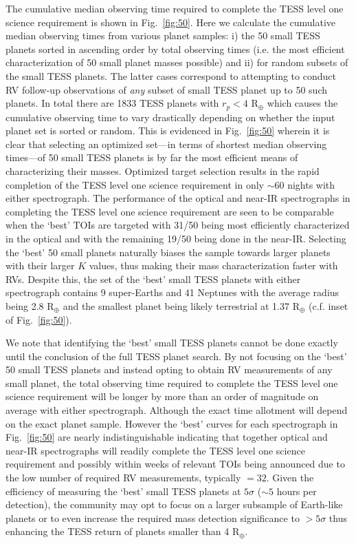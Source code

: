 The cumulative median observing time required to complete the TESS level one science requirement is shown
in Fig.~\ref{fig:50}. Here we calculate the cumulative median observing times from various planet samples:
i) the 50 small TESS planets sorted in ascending order by total observing times
(i.e. the most efficient characterization of 50 small planet masses possible) and ii)
for random subsets of the small TESS planets.
The latter cases correspond to attempting to conduct RV follow-up observations of
\emph{any} subset of small TESS planet up to 50 such planets. In total there are 1833 TESS planets with
$r_p < 4$ R$_{\oplus}$ which causes the cumulative observing time to vary drastically depending on
whether the input planet set is sorted or random. This is evidenced in Fig.~\ref{fig:50} wherein it is
clear that selecting an optimized set---in terms of shortest median observing times---of 50 small TESS planets
is by far the most efficient means of characterizing their masses. Optimized target selection results in the
rapid completion of the TESS level one science requirement in only $\sim 60$ nights with either spectrograph.
The performance of the optical and near-IR spectrographs in completing the TESS level one science
requirement are seen to be comparable when the `best' TOIs are targeted with 31/50 being most efficiently
characterized in the optical and with the remaining 19/50 being done in the near-IR. Selecting
the `best' 50 small planets naturally biases the sample towards larger planets with their larger $K$ values, 
thus making their mass characterization faster with RVs. Despite this, the set of the `best' small TESS planets
with either spectrograph contains 9 super-Earths and 41 Neptunes with the average radius being 2.8 R$_{\oplus}$
and the smallest planet being likely terrestrial at 1.37 R$_{\oplus}$ (c.f. inset of Fig.~\ref{fig:50}).

We note that identifying the `best' small TESS planets cannot be done exactly
until the conclusion of the full TESS planet search. By not focusing on the `best' 50 small
TESS planets and instead opting to obtain RV measurements of any small planet, the total observing time
required to complete the TESS level one science requirement will be longer by more than an order of magnitude
on average with either spectrograph. Although the exact time allotment will depend on the exact
planet sample. However the `best' curves for each spectrograph in Fig.~\ref{fig:50} are nearly
indistinguishable indicating that together optical and near-IR spectrographs will readily complete the TESS
level one science requirement and possibly within weeks of relevant TOIs being announced due to the low number
of required RV measurements, typically \nrv{}$=32$.
Given the efficiency of measuring the `best' small TESS planets at $5\sigma$ ($\sim 5$ hours per
detection), the community may opt to focus on a larger subsample of Earth-like planets or to even increase the
required mass detection significance to $> 5\sigma$ thus enhancing the TESS return of planets smaller than
4 R$_{\oplus}$.

